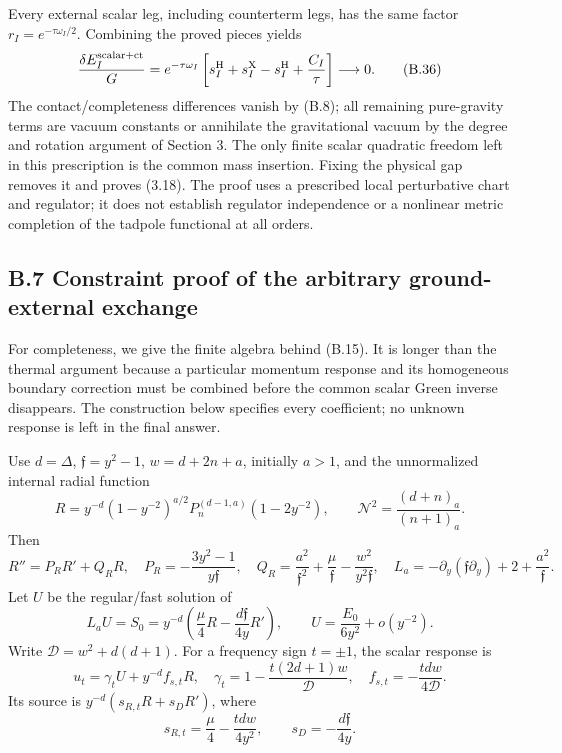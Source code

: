 Every external scalar leg, including counterterm legs, has the same factor \(r_I=e^{-\tau\omega_I/2}\). Combining the proved pieces yields \[
\frac{\delta E_I^{\rm scalar+ct}}G
=e^{-\tau\omega_I}
\left[s_I^{\rm H}+s_I^{\rm X}-s_I^{\rm H}
+\frac{C_I}{\tau}\right]
\longrightarrow0 .
\tag{B.36}
\] The contact/completeness differences vanish by (B.8); all remaining pure-gravity terms are vacuum constants or annihilate the gravitational vacuum by the degree and rotation argument of Section 3. The only finite scalar quadratic freedom left in this prescription is the common mass insertion. Fixing the physical gap removes it and proves (3.18). The proof uses a prescribed local perturbative chart and regulator; it does not establish regulator independence or a nonlinear metric completion of the tadpole functional at all orders.

\hypertarget{b.7-constraint-proof-of-the-arbitrary-ground-external-exchange}{%
\subsection{B.7 Constraint proof of the arbitrary ground-external exchange}\label{b.7-constraint-proof-of-the-arbitrary-ground-external-exchange}}

For completeness, we give the finite algebra behind (B.15). It is longer than the thermal argument because a particular momentum response and its homogeneous boundary correction must be combined before the common scalar Green inverse disappears. The construction below specifies every coefficient; no unknown response is left in the final answer.

Use \(d=\Delta\), \(\mathfrak f=y^2-1\), \(w=d+2n+a\), initially \(a>1\), and the unnormalized internal radial function \[
R=y^{-d}(1-y^{-2})^{a/2}
P_n^{(d-1,a)}(1-2y^{-2}),\qquad
\mathcal N^2=\frac{(d+n)_a}{(n+1)_a}.
\] Then \[
R''=P_RR'+Q_RR,\quad
P_R=-\frac{3y^2-1}{y\mathfrak f},\quad
Q_R=\frac{a^2}{\mathfrak f^2}+\frac{\mu}{\mathfrak f}
-\frac{w^2}{y^2\mathfrak f},
\quad
L_a=-\partial_y(\mathfrak f\partial_y)+2+\frac{a^2}{\mathfrak f}.
\tag{B.37}
\] Let \(U\) be the regular/fast solution of \[
L_aU=S_0=y^{-d}
\left(\frac{\mu}{4}R-\frac{d\mathfrak f}{4y}R'\right),
\qquad
U=\frac{E_0}{6y^2}+o(y^{-2}).
\tag{B.38}
\] Write \(\mathcal D=w^2+d(d+1)\). For a frequency sign \(t=\pm1\), the scalar response is \[
u_t=\gamma_tU+y^{-d}f_{s,t}R,\quad
\gamma_t=1-\frac{t(2d+1)w}{\mathcal D},\quad
f_{s,t}=-\frac{tdw}{4\mathcal D}.
\tag{B.39}
\] Its source is \(y^{-d}(s_{R,t}R+s_DR')\), where \[
s_{R,t}=\frac{\mu}{4}-\frac{tdw}{4y^2},
\qquad s_D=-\frac{d\mathfrak f}{4y}.
\]

